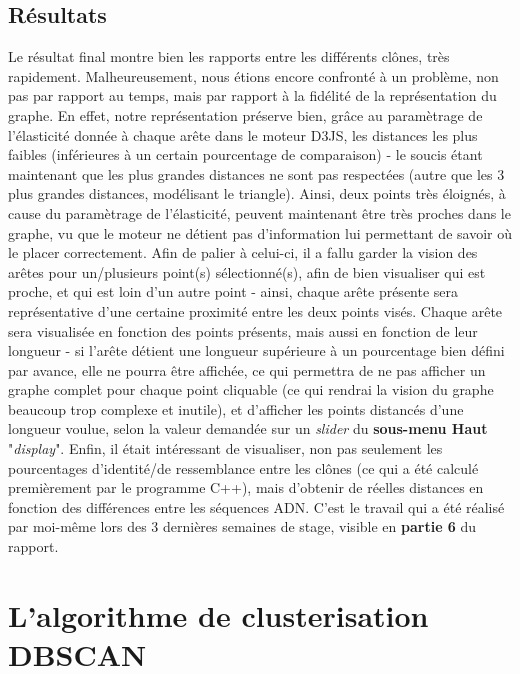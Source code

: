 \documentclass[12pt]{report}
\begin{document}
\begin{spacing}{1.2}
\section{Résultats}

Le résultat final montre bien les rapports entre les différents clônes, très rapidement.
\newline
Malheureusement, nous étions encore confronté à un problème, non pas par rapport au temps, mais par rapport à la fidélité de la représentation du graphe.
\newline
En effet, notre représentation préserve bien, grâce au paramètrage de l'élasticité donnée à chaque arête dans le moteur D3JS, les distances les plus faibles (inférieures à un certain pourcentage de comparaison) - le soucis étant maintenant que les plus grandes distances ne sont pas respectées (autre que les 3 plus grandes distances, modélisant le triangle). Ainsi, deux points très éloignés, à cause du paramètrage de l'élasticité, peuvent maintenant être très proches dans le graphe, vu que le moteur ne détient pas d'information lui permettant de savoir où le placer correctement.
\newline
Afin de palier à celui-ci, il a fallu garder la vision des arêtes pour un/plusieurs point(s) sélectionné(s), afin de bien visualiser qui est proche, et qui est loin d'un autre point - ainsi, chaque arête présente sera représentative d'une certaine proximité entre les deux points visés. 
\newline
Chaque arête sera visualisée en fonction des points présents, mais aussi en fonction de leur longueur - si l'arête détient une longueur supérieure à un pourcentage bien défini par avance, elle ne pourra être affichée, ce qui permettra de ne pas afficher un graphe complet pour chaque point cliquable (ce qui rendrai la vision du graphe beaucoup trop complexe et inutile), et d'afficher les points distancés d'une longueur voulue, selon la valeur demandée sur un \textit{slider} du \textbf{sous-menu Haut} "\textit{display}".
\newline
Enfin, il était intéressant de visualiser, non pas seulement les pourcentages d'identité/de ressemblance entre les clônes (ce qui a été calculé premièrement par le programme C++), mais d'obtenir de réelles distances en fonction des différences entre les séquences ADN. C'est le travail qui a été réalisé par moi-même lors des 3 dernières semaines de stage, visible en \textbf{partie 6} du rapport.

\chapter{L'algorithme de clusterisation DBSCAN}


\end{spacing}
\end{document}

